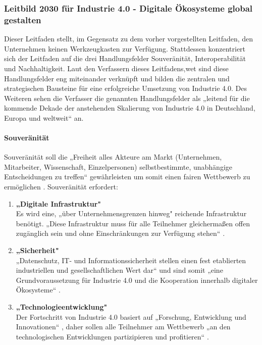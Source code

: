 \subsubsection{Leitbild 2030 für Industrie 4.0 - Digitale Ökosysteme global gestalten}\label{sec:PlattformIndustrieLeitfaden}
Dieser Leitfaden stellt, im Gegensatz zu dem vorher vorgestellten Leitfaden, den Unternehmen keinen Werkzeugkasten zur Verfügung. Stattdessen konzentriert sich der Leitfaden auf die drei Handlungsfelder Souveränität, Interoperabilität und Nachhaltigkeit. Laut den Verfassern dieses Leitfadens,wet sind diese Handlungsfelder eng miteinander verknüpft und bilden die zentralen und strategischen Bausteine für eine erfolgreiche Umsetzung von Industrie 4.0. Des Weiteren sehen die Verfasser die genannten Handlungsfelder als „leitend für die kommende Dekade der anstehenden Skalierung von Industrie 4.0 in Deutschland, Europa und weltweit“ \cite[S.3]{3} an.

\paragraph{Souveränität}\label{sec:Souveränität}
\noindent Souveränität soll die „Freiheit alles Akteure am Markt (Unternehmen, Mitarbeiter, Wissenschaft, Einzelpersonen) selbstbestimmte, unabhängige Entscheidungen zu treffen“ \cite[S.4]{3} gewährleisten um somit einen fairen Wettbewerb zu ermöglichen \cite[S.4]{3}. Souveränität erfordert:
\begin{enumerate}
	\item \textbf{„Digitale Infrastruktur"} \cite[S.4]{3} \\
	Es wird eine, „über Unternehmensgrenzen hinweg" \cite[S.4]{3} reichende	Infrastruktur benötigt. „Diese Infrastruktur muss für alle Teilnehmer gleichermaßen offen zugänglich sein und ohne Einschränkungen zur Verfügung stehen“ \cite[S.4]{3}.
	\item \textbf{„Sicherheit"} \cite[S.4]{3} \\
	„Datenschutz, IT- und Informationssicherheit stellen einen fest etablierten industriellen
	und gesellschaftlichen Wert dar“ \cite[S.4]{3} und sind somit „eine Grundvoraussetzung
	für Industrie 4.0 und die Kooperation innerhalb digitaler Ökosysteme“ \cite[S.4]{3}.
	\item \textbf{„Technologieentwicklung"} \cite[S.4]{3} \\
	Der Fortschritt von Industrie 4.0 basiert auf „Forschung, Entwicklung und Innovationen“ 
	\cite[S.4]{3}, daher sollen alle Teilnehmer am Wettbewerb „an den technologischen 
	Entwicklungen partizipieren und profitieren“ \cite[S.4]{3}.
\end{enumerate}

